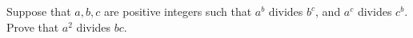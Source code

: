Suppose that $a,b,c$ are positive integers such that $a^b$ divides $b^c$, and $a^c$ divides $c^b$. Prove that $a^2$ divides $bc$.